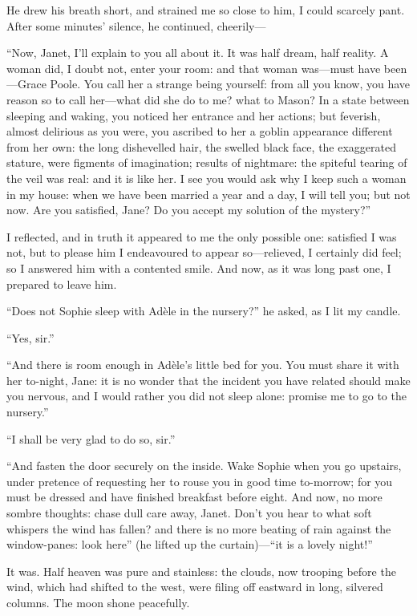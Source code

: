 He drew his breath short, and strained me so close to him, I could
scarcely pant.  After some minutes' silence, he continued, cheerily---

\enquote{Now, Janet, I'll explain to you all about it.  It was half
dream, half reality.  A woman did, I doubt not, enter your room: and
that woman was---must have been---Grace Poole.  You call her a strange
being yourself: from all you know, you have reason so to call her---what
did she do to me? what to Mason?  In a state between sleeping and
waking, you noticed her entrance and her actions; but feverish, almost
delirious as you were, you ascribed to her a goblin appearance different
from her own: the long dishevelled hair, the swelled black face, the
exaggerated stature, were figments of imagination; results of nightmare:
the spiteful tearing of the veil was real: and it is like her.  I see
you would ask why I keep such a woman in my house: when we have been
married a year and a day, I will tell you; but not now.  Are you
satisfied, Jane?  Do you accept my solution of the mystery?}

I reflected, and in truth it appeared to me the only possible one:
satisfied I was not, but to please him I endeavoured to appear
so---relieved, I certainly did feel; so I answered him with a contented
smile.  And now, as it was long past one, I prepared to leave him.

\enquote{Does not Sophie sleep with Adèle in the nursery?} he asked, as
I lit my candle.

\enquote{Yes, sir.}

\enquote{And there is room enough in Adèle's little bed for you.  You
must share it with her to-night, Jane: it is no wonder that the incident
you have related should make you nervous, and I would rather you did not
sleep alone: promise me to go to the nursery.}

\enquote{I shall be very glad to do so, sir.}

\enquote{And fasten the door securely on the inside.  Wake Sophie when
you go upstairs, under pretence of requesting her to rouse you in good
time to-morrow; for you must be dressed and have finished breakfast
before eight.  And now, no more sombre thoughts: chase dull care away,
Janet.  Don't you hear to what soft whispers the wind has fallen? and
there is no more beating of rain against the window-panes: look here}
(he lifted up the curtain)---\enquote{it is a lovely night!}

It was.  Half heaven was pure and stainless: the clouds, now trooping
before the wind, which had shifted to the west, were filing off eastward
in long, silvered columns.  The moon shone peacefully.

